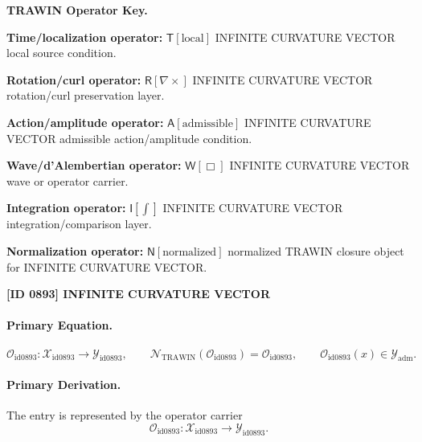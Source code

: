 \par\vspace{0.45\baselineskip}
\noindent\begin{minipage}[t]{\linewidth}
\begingroup
\small
\raggedright
\textbf{TRAWIN Operator Key.}\par
\noindent\textbf{Time/localization operator:} $\mathsf{T}\!\left[\mathrm{local}\right]$ INFINITE CURVATURE VECTOR local source condition.\par
\noindent\textbf{Rotation/curl operator:} $\mathsf{R}\!\left[\nabla\times\right]$ INFINITE CURVATURE VECTOR rotation/curl preservation layer.\par
\noindent\textbf{Action/amplitude operator:} $\mathsf{A}\!\left[\mathrm{admissible}\right]$ INFINITE CURVATURE VECTOR admissible action/amplitude condition.\par
\noindent\textbf{Wave/d'Alembertian operator:} $\mathsf{W}\!\left[\Box\right]$ INFINITE CURVATURE VECTOR wave or operator carrier.\par
\noindent\textbf{Integration operator:} $\mathsf{I}\!\left[\int\right]$ INFINITE CURVATURE VECTOR integration/comparison layer.\par
\noindent\textbf{Normalization operator:} $\mathsf{N}\!\left[\mathrm{normalized}\right]$ normalized TRAWIN closure object for INFINITE CURVATURE VECTOR.\par
\endgroup
\end{minipage}

\clearpage
\noindent\textbf{[ID 0893] INFINITE CURVATURE VECTOR}\par
\vspace{0.35em}
\paragraph{Primary Equation.}
\[
\mathcal{O}_{\mathrm{id0893}}:\mathcal{X}_{\mathrm{id0893}}\longrightarrow \mathcal{Y}_{\mathrm{id0893}},\qquad
\mathcal{N}_{\mathrm{TRAWIN}}(\mathcal{O}_{\mathrm{id0893}})=\mathcal{O}_{\mathrm{id0893}},\qquad
\mathcal{O}_{\mathrm{id0893}}(x)\in\mathcal{Y}_{\mathrm{adm}}.
\]

\paragraph{Primary Derivation.} The entry is represented by the operator carrier\[
\mathcal{O}_{\mathrm{id0893}}:\mathcal{X}_{\mathrm{id0893}}\longrightarrow \mathcal{Y}_{\mathrm{id0893}}.
\]

